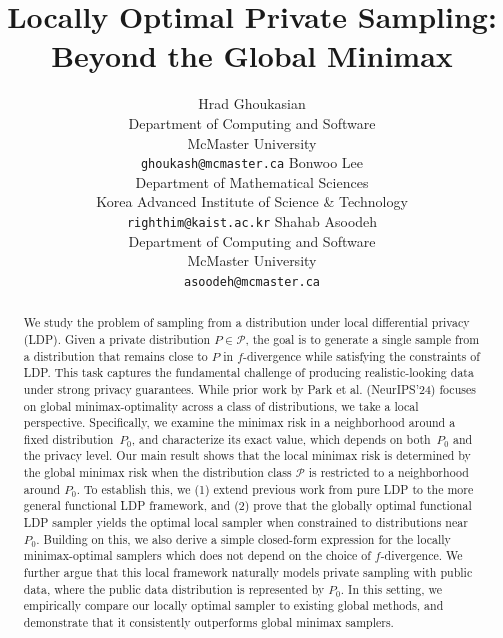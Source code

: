 \documentclass[accepted]{article}
\title{Locally Optimal Private Sampling: Beyond the Global Minimax}
\author{%
  Hrad Ghoukasian \\
  Department of Computing and Software \\
  McMaster University \\
  \texttt{ghoukash@mcmaster.ca}
  \And
  Bonwoo Lee \\
  Department of Mathematical Sciences \\
  Korea Advanced Institute of Science \& Technology \\
  \texttt{righthim@kaist.ac.kr}
  \And
  Shahab Asoodeh \\
  Department of Computing and Software \\
  McMaster University \\
  \texttt{asoodeh@mcmaster.ca}
}
\theoremstyle{plain} %
\theoremstyle{definition}
\theoremstyle{remark}
\begin{document}
\maketitle


\begin{abstract}
We study the problem of sampling from a distribution under local differential privacy (LDP). Given a private distribution $P \in \mathcal{P}$, the goal is to generate a single sample from a distribution that remains close to $P$ in $f$-divergence while satisfying the constraints of LDP. This task captures the fundamental challenge of producing realistic-looking data under strong privacy guarantees.
While prior work by Park et al. (NeurIPS'24) focuses on global minimax-optimality across a class of distributions, we take a local perspective. Specifically, we examine the minimax risk in a neighborhood around a fixed distribution~$P_0$, and characterize its exact value, which depends on both~$P_0$ and the privacy level.
Our main result shows that the local minimax risk is determined by the global minimax risk when the distribution class $\mathcal{P}$ is restricted to a neighborhood around $P_0$.
To establish this, we (1) extend previous work from pure LDP to the more general functional LDP framework, and (2) prove that the globally optimal functional LDP sampler yields the optimal local sampler when constrained to distributions near $P_0$. Building on this, we also derive a simple closed-form expression for the locally minimax-optimal samplers which does not depend on the choice of $f$-divergence.
We further argue that this local framework naturally models private sampling with public data, where the public data distribution is represented by $P_0$. In this setting, we empirically compare our locally optimal sampler to existing global methods, and demonstrate that it consistently outperforms global minimax samplers.

\end{abstract}
\vspace{0.05cm}
\end{document}
